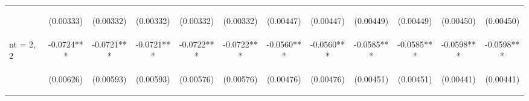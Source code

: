 \documentclass[]{article}
\begin{document}
\begin{center}
\begin{tabular}{lccccccccccc}
\vspace{4pt} & \begin{footnotesize}(0.00333)\end{footnotesize} & \begin{footnotesize}(0.00332)\end{footnotesize} & \begin{footnotesize}(0.00332)\end{footnotesize} & \begin{footnotesize}(0.00332)\end{footnotesize} & \begin{footnotesize}(0.00332)\end{footnotesize} & \begin{footnotesize}(0.00447)\end{footnotesize} & \begin{footnotesize}(0.00447)\end{footnotesize} & \begin{footnotesize}(0.00449)\end{footnotesize} & \begin{footnotesize}(0.00449)\end{footnotesize} & \begin{footnotesize}(0.00450)\end{footnotesize} & \begin{footnotesize}(0.00450)\end{footnotesize} \\
nt = 2, 2 & -0.0724*** & -0.0721*** & -0.0721*** & -0.0722*** & -0.0722*** & -0.0560*** & -0.0560*** & -0.0585*** & -0.0585*** & -0.0598*** & -0.0598*** \\
\vspace{4pt} & \begin{footnotesize}(0.00626)\end{footnotesize} & \begin{footnotesize}(0.00593)\end{footnotesize} & \begin{footnotesize}(0.00593)\end{footnotesize} & \begin{footnotesize}(0.00576)\end{footnotesize} & \begin{footnotesize}(0.00576)\end{footnotesize} & \begin{footnotesize}(0.00476)\end{footnotesize} & \begin{footnotesize}(0.00476)\end{footnotesize} & \begin{footnotesize}(0.00451)\end{footnotesize} & \begin{footnotesize}(0.00451)\end{footnotesize} & \begin{footnotesize}(0.00441)\end{footnotesize} & \begin{footnotesize}(0.00441)\end{footnotesize} \\

\end{tabular}
\end{center}
\end{document}
